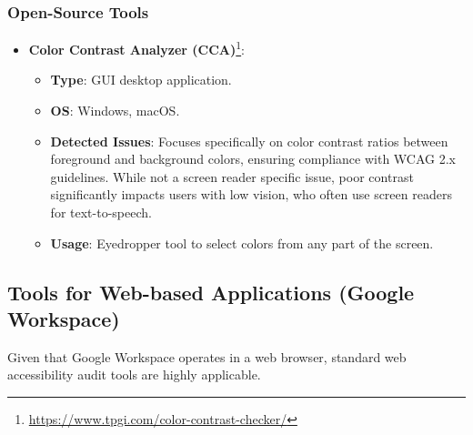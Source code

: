\subsubsection{Open-Source Tools}
\begin{itemize}
    \item \textbf{Color Contrast Analyzer (CCA)}\footnote{\url{https://www.tpgi.com/color-contrast-checker/}}:
        \begin{itemize}
            \item \textbf{Type}: GUI desktop application.
            \item \textbf{OS}: Windows, macOS.
            \item \textbf{Detected Issues}: Focuses specifically on color contrast ratios between foreground and background colors, ensuring compliance with WCAG 2.x guidelines. While not a screen reader specific issue, poor contrast significantly impacts users with low vision, who often use screen readers for text-to-speech.
            \item \textbf{Usage}: Eyedropper tool to select colors from any part of the screen.
        \end{itemize}
\end{itemize}

\subsection{Tools for Web-based Applications (Google Workspace)}

Given that Google Workspace operates in a web browser, standard web accessibility audit tools are highly applicable.


